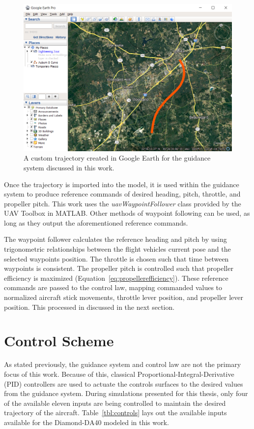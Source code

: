 \begin{figure}[!ht]
    \centering
    \includegraphics[width=0.75\linewidth]{Figures/auburnScurve.png}
    \caption{A custom trajectory created in Google Earth for the guidance system discussed in this work.}\label{fig:googleEarth}
\end{figure}

Once the trajectory is imported into the model, it is used within the guidance system to produce reference commands of desired heading, pitch, throttle, and propeller pitch. This work uses the \textit{uavWaypointFollower} class provided by the UAV Toolbox in MATLAB\@. Other methods of waypoint following can be used, as long as they output the aforementioned reference commands.

The waypoint follower calculates the reference heading and pitch by using trigonometric relationships between the flight vehicles current pose and the selected waypoints position. The throttle is chosen such that time between waypoints is consistent. The propeller pitch is controlled such that propeller efficiency is maximized (Equation~\ref{eq:propellerefficiency}). These reference commands are passed to the control law, mapping commanded values to normalized aircraft stick movements, throttle lever position, and propeller lever position. This processed in discussed in the next section.

\section{\textbf{Control Scheme}}

As stated previously, the guidance system and control law are not the primary focus of this work. Because of this, classical Proportional-Integral-Derivative (PID) controllers are used to actuate the controls surfaces to the desired values from the guidance system. During simulations presented for this thesis, only four of the available eleven inputs are being controlled to maintain the desired trajectory of the aircraft. Table~\ref{tbl:controls} lays out the available inputs available for the Diamond-DA40 modeled in this work.

